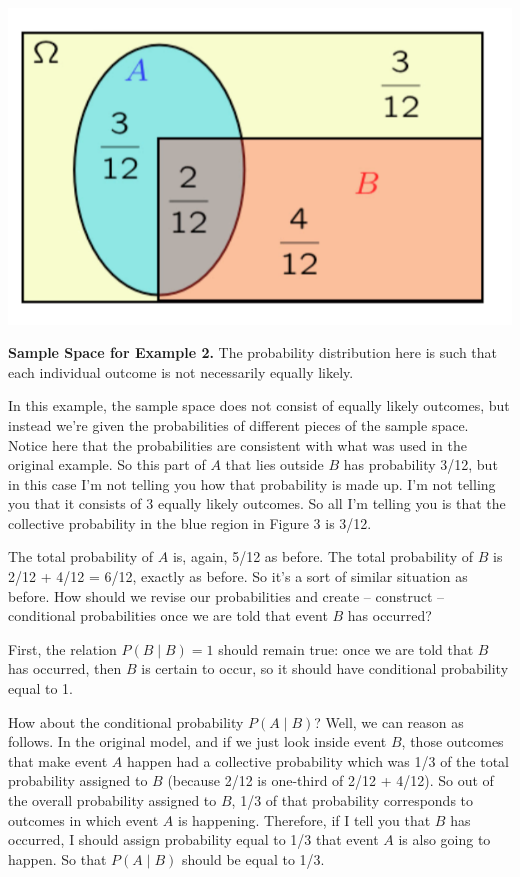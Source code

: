 \documentclass{tufte-handout}
\begin{document}
\pagebreak
\begin{marginfigure}
  \includegraphics{CondWithProbs}
  \caption{\textbf{Sample Space for Example 2.} The probability distribution here is such that each individual outcome is not necessarily equally likely.}
\end{marginfigure}
 In this example, the sample space does not consist of equally likely outcomes, but instead we're given
the probabilities of different pieces of the sample space. Notice here that the
probabilities are consistent with what was used in the original example. So this part of $A$ that lies outside
$B$ has probability 3/12, but in this case I'm not telling you how that probability is made up. I'm not telling
you that it consists of 3 equally likely outcomes. So all I'm telling you is that the collective probability in
the blue region in Figure 3 is 3/12.



The total probability of $A$ is, again, 5/12 as before. The total probability of $B$ is 2/12 + 4/12 = 6/12,
exactly as before. So it's a sort of similar situation as before. How should we revise our probabilities and
create -- construct -- conditional probabilities once we are told that event $B$ has occurred?

First, the relation $P(B \mid B) = 1$ should remain true: once we are told that $B$ has occurred, then $B$ is certain to occur,
so it should have conditional probability equal to 1. 

How about the conditional probability  $P(A \mid B)$? Well, we can reason as follows. In the original model, 
and if we just look inside event
$B$, those outcomes that make event $A$ happen had a collective probability which was 1/3 of the total
probability assigned to $B$ (because 2/12 is one-third of 2/12 + 4/12). So out of the overall probability assigned to $B$, 1/3 of that probability
corresponds to outcomes in which event $A$ is happening. Therefore, if I tell you that $B$ has occurred, I
should assign probability equal to 1/3 that event $A$ is also going to happen. So that $P( A \mid B )$ should be equal to 1/3.
\end{document}
